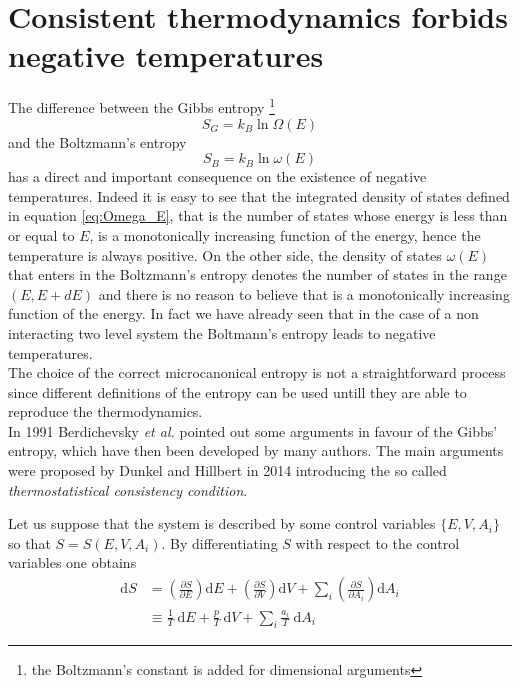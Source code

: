 \section{Consistent thermodynamics forbids negative temperatures}
The difference between the Gibbs entropy \footnote{the Boltzmann's constant is added for dimensional arguments}
\begin{equation}
    S_G = k_B \ln \Omega(E)
    \label{eq:gibbs_entropy_formula}
\end{equation}  
and the Boltzmann's entropy 
\begin{equation}
    S_B = k_B \ln \omega(E)
    \label{eq:Boltzmann_entropy_formula}
\end{equation}
has a direct and important consequence on the existence of negative temperatures. Indeed it is easy to see that the integrated density of states defined in equation 
\ref{eq:Omega_E}, that is the number of states whose energy is less than or equal to $E$, is a monotonically increasing function of the energy, hence the temperature is always positive. On the other side,
the density of states $\omega(E)$ that enters in the Boltzmann's entropy denotes the number of states in the range $(E, E+dE)$ and there is no reason to believe that is a monotonically increasing function of the energy. In fact we have already seen
that in the case of a non interacting two level system the Boltmann's entropy leads to negative temperatures. \\
The choice of the correct microcanonical entropy is not a straightforward process since different definitions of the entropy can be used untill they are able to reproduce the thermodynamics. \\
In 1991 Berdichevsky \textit{et al.} \cite{original_entropy} pointed out some arguments in favour of the Gibbs' entropy, which have then been developed by many authors. The main arguments were proposed by 
Dunkel and Hillbert in 2014 \cite{Dunkel_Hillbert} introducing the so called \emph{thermostatistical consistency condition}. \par 
\vspace{10pt} 
Let us suppose that the system is described by some control variables $\{E, V, A_i\}$ so that $S = S(E, V, A_i)$. By differentiating $S$ with respect to the control variables one obtains
\begin{equation*}
    \begin{aligned}
        \mathrm{d} S &=\left(\frac{\partial S}{\partial E}\right) \mathrm{d} E+\left(\frac{\partial S}{\partial V}\right) \mathrm{d} V+\sum_{i}\left(\frac{\partial S}{\partial A_{i}}\right) \mathrm{d} A_{i} \\
        & \equiv \frac{1}{T} \mathrm{~d} E+\frac{p}{T} \mathrm{~d} V+\sum_{i} \frac{a_{i}}{T} \mathrm{~d} A_{i}
        \end{aligned}
\end{equation*}
